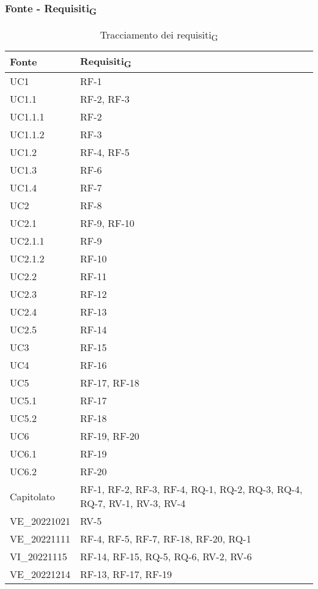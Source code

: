\subsubsection{Fonte - Requisiti\textsubscript{G}}
\begin{table}[H]
	\centering
	\begin{tabular}{| p{} | p{} |} 
 \hline
 \textbf{Fonte} & \textbf{Requisiti\textsubscript{G}} \\
 \hline
	UC1 & RF-1\\
	\hline
	UC1.1 & RF-2, RF-3\\
    \hline
	UC1.1.1 & RF-2\\
    \hline
	UC1.1.2 & RF-3\\
	\hline
	UC1.2 & RF-4, RF-5\\
	\hline
	UC1.3 & RF-6\\
	\hline
	UC1.4 & RF-7\\
	\hline
	UC2 & RF-8\\
 	\hline
	UC2.1 & RF-9, RF-10\\
 \hline
	UC2.1.1 & RF-9\\
  \hline
	UC2.1.2 & RF-10\\
 	\hline
	UC2.2 & RF-11\\
  	\hline
	UC2.3 & RF-12\\
  	\hline
	UC2.4 & RF-13\\
  	\hline
	UC2.5 & RF-14\\
	\hline
	UC3 & RF-15\\ 
	\hline
	UC4 & RF-16\\
 	\hline
	UC5 & RF-17, RF-18\\
 \hline
	UC5.1 & RF-17\\
 \hline
	UC5.2 & RF-18\\
 	\hline
	UC6 & RF-19, RF-20\\
 \hline
	UC6.1 & RF-19\\
 \hline
	UC6.2 & RF-20\\
	\hline
	Capitolato & RF-1, RF-2, RF-3, RF-4, RQ-1, RQ-2, RQ-3, RQ-4, RQ-7, RV-1, RV-3, RV-4\\
 	\hline
	VE\_20221021 & RV-5\\
	\hline
	VE\_20221111 & RF-4, RF-5, RF-7, RF-18, RF-20, RQ-1\\
	\hline
	VI\_20221115 & RF-14, RF-15, RQ-5, RQ-6, RV-2, RV-6\\
 	\hline
	VE\_20221214 & RF-13, RF-17, RF-19\\
	\hline
	\end{tabular}
	\caption{Tracciamento dei requisiti\textsubscript{G}}
\end{table}

